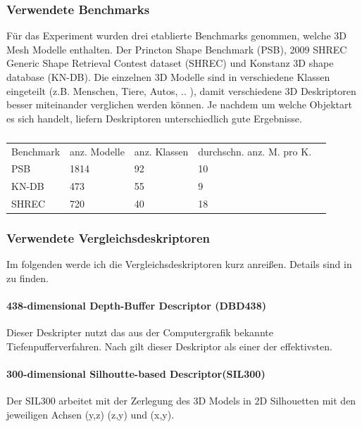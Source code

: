 \subsubsection{Verwendete Benchmarks}
Für das Experiment wurden drei etablierte Benchmarks genommen, welche 3D Mesh Modelle enthalten. Der Princton Shape Benchmark (PSB), 2009 SHREC Generic Shape Retrieval Contest dataset (SHREC) und Konstanz 3D shape database (KN-DB). Die einzelnen 3D Modelle sind in verschiedene Klassen eingeteilt (z.B. Menschen, Tiere, Autos, .. ), damit verschiedene 3D Deskriptoren besser miteinander verglichen werden können. Je nachdem um welche Objektart es sich handelt, liefern Deskriptoren unterschiedlich gute Ergebnisse. 

\begin{table}[H]
	\centering
	\caption{}
	\label{Benchmarks}
	\begin{tabular}{lllll}
		Benchmark & anz. Modelle & anz. Klassen & durchschn. anz. M. pro K. &  \\
		PSB       & 1814         & 92           & 10                                 &  \\
		KN-DB     & 473          & 55           & 9                                  &  \\
		SHREC     & 720          & 40          & 18                                & 
	\end{tabular}
\end{table}
\subsubsection{Verwendete Vergleichsdeskriptoren}
Im folgenden werde ich die Vergleichsdeskriptoren kurz anreißen. Details sind in \cite{dvvra3DModelret} zu finden.

\paragraph{438-dimensional Depth-Buffer Descriptor (DBD438)}
Dieser Deskripter nutzt das aus der Computergrafik bekannte Tiefenpufferverfahren. Nach \cite{scherer2010histograms} gilt dieser Deskriptor als einer der effektivsten.

\paragraph{300-dimensional Silhoutte-based Descriptor(SIL300)}
Der SIL300 arbeitet mit der Zerlegung des 3D Models in 2D Silhouetten 
mit den jeweiligen Achsen (y,z) (z,y) und (x,y).

